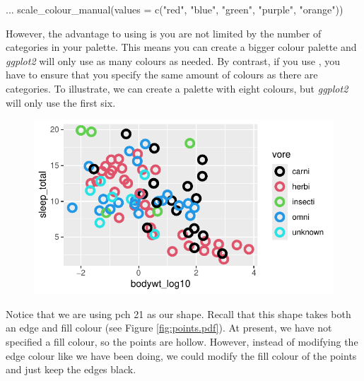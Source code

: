 \begin{inR}
...
scale_colour_manual(values = c("red", "blue", "green", "purple", "orange"))
\end{inR}

\vspace{1em}

\noindent
However, the advantage to using  is you are not limited by the number of categories in your palette. This means you can create a bigger colour palette and \textit{ggplot2} will only use as many colours as needed. By contrast, if you use , you have to ensure that you specify the same amount of colours as there are categories. To illustrate, we can create a palette with eight colours, but \textit{ggplot2} will only use the first six.


\vspace{2em}

\begin{figure}[H]
\includegraphics[scale = .75]{graphics/ch2Figs/ggEx_23.pdf}
\end{figure}


Notice that we are using pch 21 as our shape. Recall that this shape takes both an edge and fill colour (see Figure \ref{fig:points.pdf}). At present, we have not specified a fill colour, so the points are hollow. However, instead of modifying the edge colour like we have been doing, we could modify the fill colour of the points and just keep the edges black.

